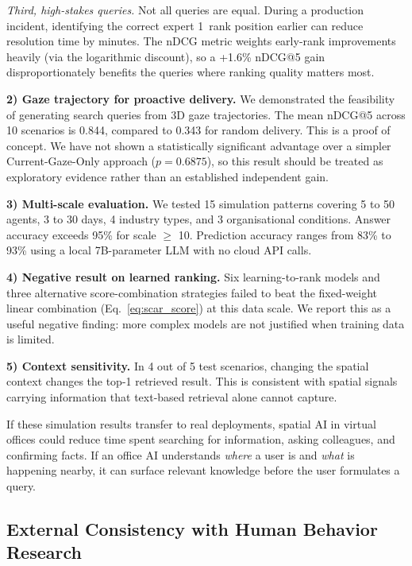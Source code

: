 \documentclass[journal]{IEEEtran}
\begin{document}
\emph{Third, high-stakes queries.}  Not all queries are equal.  During a production incident, identifying the correct expert 1~rank position earlier can reduce resolution time by minutes.  The nDCG metric weights early-rank improvements heavily (via the logarithmic discount), so a +1.6\% nDCG@5 gain disproportionately benefits the queries where ranking quality matters most.

\textbf{2) Gaze trajectory for proactive delivery.}
We demonstrated the feasibility of generating search queries from 3D gaze trajectories.
The mean nDCG@5 across 10 scenarios is 0.844, compared to 0.343 for random delivery.
This is a proof of concept. We have not shown a statistically
significant advantage over a simpler Current-Gaze-Only approach
($p = 0.6875$), so this result should be treated as exploratory
evidence rather than an established independent gain.

\textbf{3) Multi-scale evaluation.}
We tested 15 simulation patterns covering 5 to 50 agents, 3 to 30 days, 4 industry types, and 3 organisational conditions.
Answer accuracy exceeds 95\% for scale $\geq$ 10.
Prediction accuracy ranges from 83\% to 93\% using a local 7B-parameter LLM with no cloud API calls.

\textbf{4) Negative result on learned ranking.}
Six learning-to-rank models and three alternative score-combination strategies failed to beat the fixed-weight linear combination (Eq.~\ref{eq:scar_score}) at this data scale.
We report this as a useful negative finding: more complex models are not justified when training data is limited.

\textbf{5) Context sensitivity.}
In 4 out of 5 test scenarios, changing the spatial context changes the top-1 retrieved result.
This is consistent with spatial signals carrying information that text-based retrieval alone cannot capture.

If these simulation results transfer to real deployments,
spatial AI in virtual offices could reduce time spent searching for information, asking colleagues, and confirming facts.
If an office AI understands \emph{where} a user is and \emph{what} is happening nearby, it can surface relevant knowledge before the user formulates a query.

\subsection{External Consistency with Human Behavior Research}
\label{subsec:external_consistency}
\end{document}
